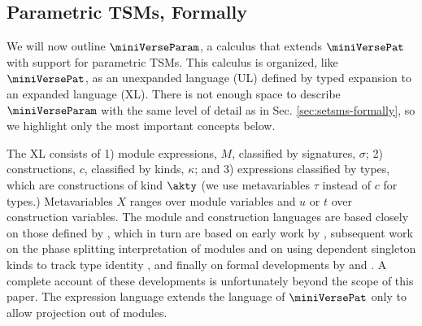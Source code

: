 \documentclass[acmlarge,review,anonymous]{acmart}\settopmatter{printfolios=true}
\begin{document}
\subsection{Parametric TSMs, Formally}

We will now outline $\miniVerseParam$, a calculus that extends $\miniVersePat$ with support for parametric TSMs. This calculus is organized, like $\miniVersePat$, as an unexpanded language (UL) defined by typed expansion to an expanded language (XL). There is not enough space to describe $\miniVerseParam$ with the same level of detail as in Sec. \ref{sec:setsms-formally}, so we highlight only the most important concepts below.

The XL consists of 1) module expressions, $M$, classified by signatures, $\sigma$; 2) constructions, $c$, classified by kinds, $\kappa$; and 3) expressions classified by types, which are constructions of kind $\akty$ (we use metavariables $\tau$ instead of $c$ for types.) Metavariables $X$ ranges over module variables and $u$ or $t$ over construction variables. The module and construction languages are based closely on those defined by \citet{pfple1}, which in turn are based on early work by \citet{MacQueen:1984:MSM:800055.802036,DBLP:conf/popl/MacQueen86}, subsequent work on the phase splitting interpretation of modules \cite{harper1989higher} and on using dependent singleton kinds to track type identity \cite{stone2006extensional,DBLP:conf/lfmtp/Crary09}, and finally on formal developments by \citet{dreyer2005understanding} and \citet{conf/popl/LeeCH07}. A complete account of these developments is unfortunately beyond the scope of this paper. The expression language extends the language of $\miniVersePat$ only to allow projection out of modules.
\end{document}

